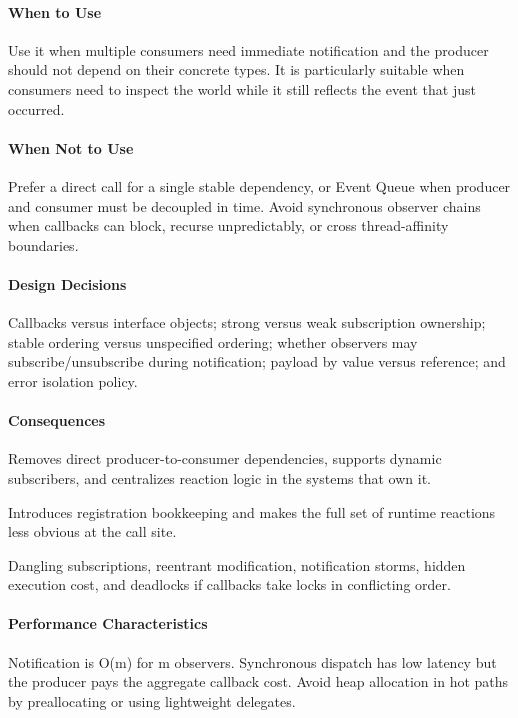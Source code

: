 \documentclass[11pt]{article}
\begin{document}
\paragraph{When to Use} Use it when multiple consumers need immediate notification and the producer should not depend on their concrete types. It is particularly suitable when consumers need to inspect the world while it still reflects the event that just occurred.
\paragraph{When Not to Use} Prefer a direct call for a single stable dependency, or Event Queue when producer and consumer must be decoupled in time. Avoid synchronous observer chains when callbacks can block, recurse unpredictably, or cross thread-affinity boundaries.
\paragraph{Design Decisions} Callbacks versus interface objects; strong versus weak subscription ownership; stable ordering versus unspecified ordering; whether observers may subscribe/unsubscribe during notification; payload by value versus reference; and error isolation policy.
\paragraph{Consequences}
\begin{description}[leftmargin=2.7cm,style=nextline]
\item[Benefits] Removes direct producer-to-consumer dependencies, supports dynamic subscribers, and centralizes reaction logic in the systems that own it.
\item[Costs] Introduces registration bookkeeping and makes the full set of runtime reactions less obvious at the call site.
\item[Risks] Dangling subscriptions, reentrant modification, notification storms, hidden execution cost, and deadlocks if callbacks take locks in conflicting order.
\end{description}
\paragraph{Performance Characteristics} Notification is O(m) for m observers. Synchronous dispatch has low latency but the producer pays the aggregate callback cost. Avoid heap allocation in hot paths by preallocating or using lightweight delegates.
\end{document}

